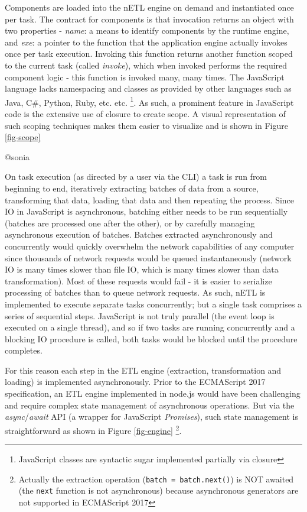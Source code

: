 Components are loaded into the nETL engine on demand and instantiated once per task. The contract for components is that invocation returns an object with two properties - \textit{name}: a means to identify components by the runtime engine, and \textit{exe}: a pointer to the function that the application engine actually invokes once per task execution. Invoking this function returns another function scoped to the current task (called \textit{invoke}), which when invoked performs the required component logic - this function is invoked many, many times. The JavaScript language lacks namespacing and classes as provided by other languages such as Java, C\#, Python, Ruby, etc. etc. \footnote{JavaScript classes are syntactic sugar implemented partially via closure}. As such, a prominent feature in JavaScript code is the extensive use of closure to create scope. A visual representation of such scoping techniques makes them easier to visualize and is shown in Figure \ref{fig-scope}



@sonia

On task execution (as directed by a user via the CLI) a task is run from beginning to end, iteratively extracting batches of data from a source, transforming that data, loading that data and then repeating the process. Since IO in JavaScript is asynchronous, batching either needs to be run sequentially (batches are processed one after the other), or by carefully managing asynchronous execution of batches. Batches extracted asynchronously and concurrently would quickly overwhelm the network capabilities of any computer since thousands of network requests would be queued instantaneously (network IO is many times slower than file IO, which is many times slower than data transformation). Most of these requests would fail - it is easier to serialize processing of batches than to queue network requests. As such, nETL is implemented to execute separate tasks concurrently; but a single task comprises a series of sequential steps. JavaScript is not truly parallel (the event loop is executed on a single thread), and so if two tasks are running concurrently and a blocking IO procedure is called, both tasks would be blocked until the procedure completes.

For this reason each step in the ETL engine (extraction, transformation and loading) is implemented asynchronously. Prior to the ECMAScript 2017 specification, an ETL engine implemented in node.js would have been challenging and require complex state management of asynchronous operations. But via the \textit{async}/\textit{await} API (a wrapper for JavaScript \textit{Promises}), such state management is straightforward as shown in Figure \ref{fig-engine} \footnote{Actually the extraction operation (\texttt{batch = batch.next()}) is NOT awaited (the \texttt{next} function is not asynchronous) because asynchronous generators are not supported in ECMAScript 2017}.

